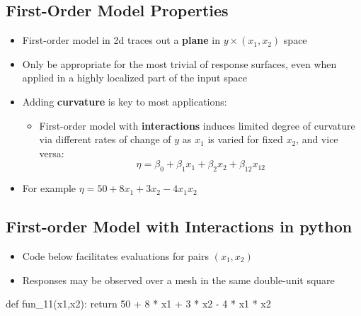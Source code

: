 \documentclass[
  letterpaper,
  DIV=11,
  numbers=noendperiod]{scrreprt}
\newenvironment{Shaded}{\begin{snugshade}}{\end{snugshade}}
\newcommand{\ControlFlowTok}[1]{\textcolor[rgb]{0.00,0.23,0.31}{#1}}
\newcommand{\DecValTok}[1]{\textcolor[rgb]{0.68,0.00,0.00}{#1}}
\newcommand{\KeywordTok}[1]{\textcolor[rgb]{0.00,0.23,0.31}{#1}}
\newcommand{\NormalTok}[1]{\textcolor[rgb]{0.00,0.23,0.31}{#1}}
\newcommand{\OperatorTok}[1]{\textcolor[rgb]{0.37,0.37,0.37}{#1}}
\providecommand{\tightlist}{%
  \setlength{\itemsep}{0pt}\setlength{\parskip}{0pt}}\usepackage{longtable,booktabs,array}
\begin{document}
\subsection{First-Order Model
Properties}\label{first-order-model-properties}

\begin{itemize}
\tightlist
\item
  First-order model in 2d traces out a \textbf{plane} in
  \(y \times (x_1, x_2)\) space
\item
  Only be appropriate for the most trivial of response surfaces, even
  when applied in a highly localized part of the input space
\item
  Adding \textbf{curvature} is key to most applications:

  \begin{itemize}
  \tightlist
  \item
    First-order model with \textbf{interactions} induces limited degree
    of curvature via different rates of change of \(y\) as \(x_1\) is
    varied for fixed \(x_2\), and vice versa:
    \[\eta = \beta_0 + \beta_1 x_1 + \beta_2 x_2 + \beta_{12} x_{12} \]
  \end{itemize}
\item
  For example \(\eta = 50+8x_1+3x_2-4x_1x_2\)
\end{itemize}

\subsection{First-order Model with Interactions in
python}\label{first-order-model-with-interactions-in-python}

\begin{itemize}
\tightlist
\item
  Code below facilitates evaluations for pairs \((x_1, x_2)\)
\item
  Responses may be observed over a mesh in the same double-unit square
\end{itemize}

\begin{Shaded}
\begin{Highlighting}[]
\KeywordTok{def}\NormalTok{ fun\_11(x1,x2):}
    \ControlFlowTok{return} \DecValTok{50} \OperatorTok{+} \DecValTok{8} \OperatorTok{*}\NormalTok{ x1 }\OperatorTok{+} \DecValTok{3} \OperatorTok{*}\NormalTok{ x2 }\OperatorTok{{-}} \DecValTok{4} \OperatorTok{*}\NormalTok{ x1 }\OperatorTok{*}\NormalTok{ x2}
\end{Highlighting}
\end{Shaded}
\end{document}
